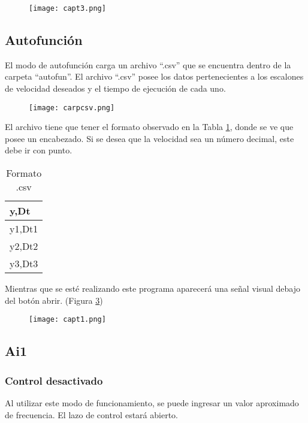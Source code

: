\begin{figure}[H]
	\centering
	\texttt{[image: capt3.png]}
	\label{fig:capt3}
\end{figure}

\subsection{Autofunción}
El modo de autofunción carga un archivo “.csv” que se encuentra dentro de la carpeta “autofun”. El archivo “.csv” posee los datos pertenecientes a los escalones de velocidad deseados y el tiempo de ejecución de cada uno.

\begin{figure}[htb]
	\centering
	\texttt{[image: carpcsv.png]}
	\label{fig:autof2}
\end{figure}


El archivo tiene que tener el formato observado en la Tabla \ref{tab:formcsv}, donde se ve que posee un encabezado. Si se desea que la velocidad sea un número decimal, este debe ir con punto. 
\begin{table}[h]
	\centering
	\begin{tabular}{|l|}
		\hline
		y,Dt \\ \hline
		y1,Dt1 \\ \hline
		y2,Dt2 \\ \hline
		y3,Dt3 \\ \hline
	\end{tabular}
	
	\caption{Formato .csv}
	\label{tab:formcsv}
\end{table}

Mientras que se esté realizando este programa aparecerá una señal visual debajo del botón abrir. (Figura \ref{fig:autof1})

\begin{figure}[htb]
	\centering
	\texttt{[image: capt1.png]}
	\label{fig:autof1}
\end{figure}



\subsection{Ai1}
\subsubsection{Control desactivado}
Al utilizar este modo de funcionamiento, se puede ingresar un valor aproximado de frecuencia. El lazo de control estará abierto.

